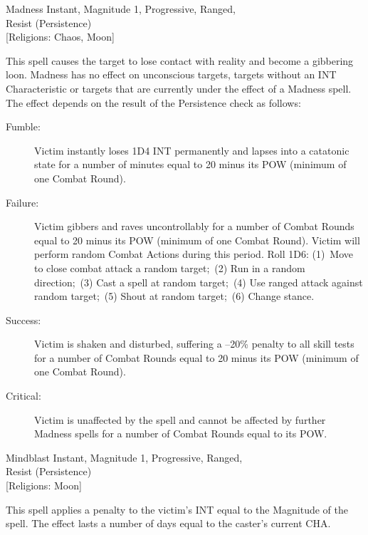 \begin{samepage}
\begin{rpg-spell}
{Madness}
{Instant, Magnitude 1, Progressive, Ranged,\\Resist (Persistence)\\{[Religions: Chaos, Moon]}}

This spell causes the target to lose contact with reality and become a gibbering loon. Madness has no effect on unconscious targets, targets without an INT Characteristic or targets that are currently under the effect of a Madness spell. The effect depends on the result of the Persistence check as follows:
\begin{description}
\item[Fumble:] Victim instantly loses 1D4 INT permanently and lapses into a catatonic state for a number of minutes equal to 20 minus its POW (minimum of one Combat Round). 
\item[Failure:] Victim gibbers and raves uncontrollably for a number of Combat Rounds equal to 20 minus its POW (minimum of one Combat Round). Victim will perform random Combat Actions during this period. Roll 1D6: (1) Move to close combat attack a random target; (2) Run in a random direction; (3) Cast a spell at random target; (4) Use ranged attack against random target; (5) Shout at random target; (6) Change stance. 
\item[Success:] Victim is shaken and disturbed, suffering a –20\% penalty to all skill tests for a number of Combat Rounds equal to 20 minus its POW (minimum of one Combat Round).
\item[Critical:] Victim is unaffected by the spell and cannot be affected by further Madness spells for a number of Combat Rounds equal to its POW.
\end{description}

\end{rpg-spell}
\end{samepage}

\begin{samepage}
\begin{rpg-spell}
{Mindblast}
{Instant, Magnitude 1, Progressive, Ranged,\\Resist (Persistence)\\{[Religions: Moon]}}

This spell applies a penalty to the victim’s INT equal to the Magnitude of the spell. The effect lasts a number of days equal to the caster’s current CHA. 
\end{rpg-spell}
\end{samepage}

